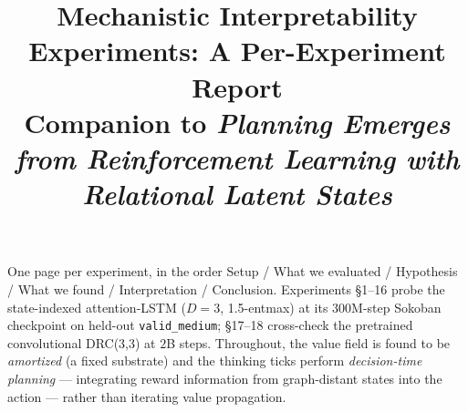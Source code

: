 \documentclass[11pt]{article}
\title{\vspace{-1.5em}Mechanistic Interpretability Experiments: A Per-Experiment Report\\[2pt]
\large Companion to \emph{Planning Emerges from Reinforcement Learning with Relational Latent States}}
\author{}\date{}
\begin{document}
\maketitle\vspace{-2.5em}

\noindent One page per experiment, in the order Setup / What we evaluated / Hypothesis / What we found /
Interpretation / Conclusion. Experiments \S1--16 probe the state-indexed attention-LSTM ($D{=}3$, 1.5-entmax)
at its $300$M-step Sokoban checkpoint on held-out \texttt{valid\_medium}; \S17--18 cross-check the pretrained
convolutional DRC(3,3) at $2$B steps. Throughout, the value field is found to be \emph{amortized} (a fixed
substrate) and the thinking ticks perform \emph{decision-time planning} --- integrating reward information
from graph-distant states into the action --- rather than iterating value propagation.
\clearpage
\end{document}
